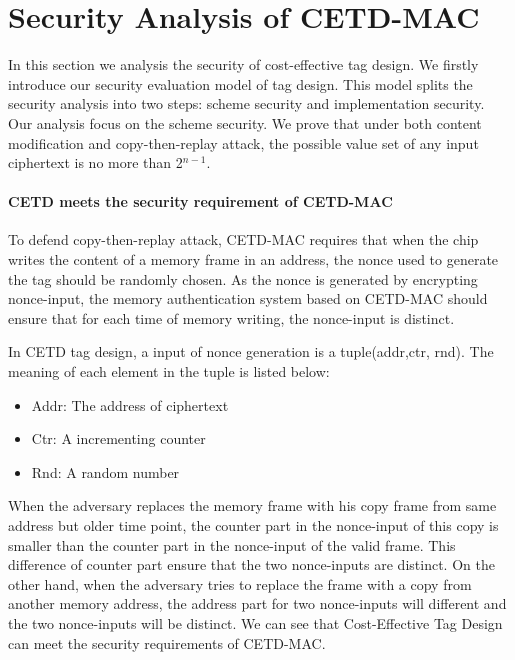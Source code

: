 
%
\section{Security Analysis of CETD-MAC}
In this section we analysis the security of cost-effective tag design. We firstly introduce our security evaluation model of tag design. This model splits the security analysis into two steps: scheme security and implementation security. Our analysis focus on the scheme security. We prove that under both content modification and copy-then-replay attack, the possible value set of any input ciphertext is no more than 2$^{n-1}$.
\paragraph{CETD meets the security requirement of CETD-MAC}
To defend copy-then-replay attack, CETD-MAC requires that when the chip writes
the content of a memory frame in an address, the nonce used to generate the tag
should be randomly chosen. As the nonce is generated by encrypting nonce-input,
the memory authentication system based on CETD-MAC should ensure that for each
time of memory writing, the nonce-input is distinct.

In CETD tag design, a input of nonce generation is a tuple(addr,ctr, rnd). The meaning of each element in the tuple is listed below: 
\begin{itemize}
	\item Addr: The address of ciphertext
	\item Ctr: A incrementing counter 
	\item Rnd: A random number
\end{itemize}
When the adversary replaces the memory frame with his copy frame from same
address but older time point, the counter part in the nonce-input of this copy
is smaller than the counter part in the nonce-input of the valid frame. This
difference of counter part ensure that the two nonce-inputs are distinct. 
On the other hand, when the adversary tries to replace the frame with a copy
from another memory address, the address part for two nonce-inputs will
different and the two nonce-inputs will be distinct.
We can see that Cost-Effective Tag Design can meet the security requirements of
CETD-MAC.

